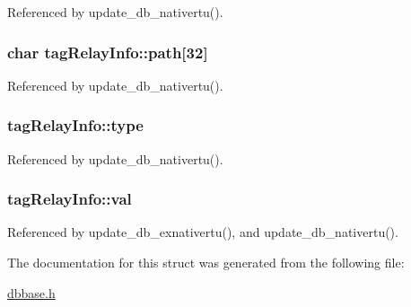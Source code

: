 Referenced by update\-\_\-db\-\_\-nativertu().

\hypertarget{structtagRelayInfo_aba2860c27c092dba8facfbd11ec1064a}{
\subsubsection[{path}]{\setlength{\rightskip}{0pt plus 5cm}char tag\-Relay\-Info\-::path\mbox{[}32\mbox{]}}}\label{structtagRelayInfo_aba2860c27c092dba8facfbd11ec1064a}


Referenced by update\-\_\-db\-\_\-nativertu().

\hypertarget{structtagRelayInfo_ab628490738aeed7e76fbcdd59fd9573e}{
\subsubsection[{type}]{ tag\-Relay\-Info\-::type}}\label{structtagRelayInfo_ab628490738aeed7e76fbcdd59fd9573e}


Referenced by update\-\_\-db\-\_\-nativertu().

\hypertarget{structtagRelayInfo_a17da547b7af601809c5e93a6f76c2ff2}{
\subsubsection[{val}]{ tag\-Relay\-Info\-::val}}\label{structtagRelayInfo_a17da547b7af601809c5e93a6f76c2ff2}


Referenced by update\-\_\-db\-\_\-exnativertu(), and update\-\_\-db\-\_\-nativertu().



The documentation for this struct was generated from the following file\-:\begin{DoxyCompactItemize}
\item 
\hyperlink{dbbase_8h}{dbbase.\-h}\end{DoxyCompactItemize}

